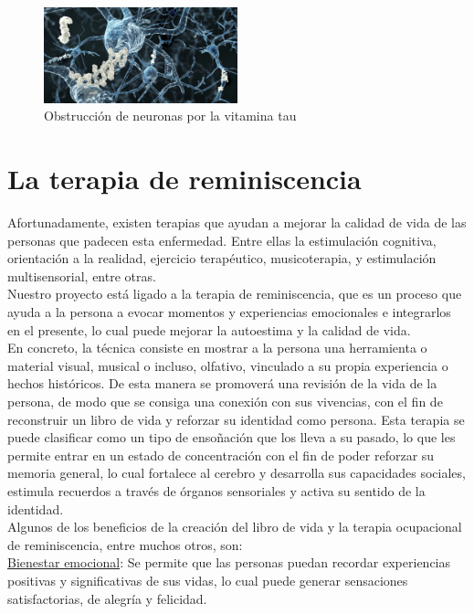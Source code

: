 \begin{figure}[h]
	\centering
	\includegraphics[width = 0.5\textwidth]{Imagenes/Vectorial/proteina-tau.jpg}
	\caption{Obstrucción de neuronas por la vitamina tau}
	\label{fig:tau}
\end{figure}

\section{La terapia de reminiscencia}

Afortunadamente, existen terapias que ayudan a mejorar la calidad de vida de las personas que padecen esta enfermedad. Entre ellas la estimulación cognitiva, orientación a la realidad, ejercicio terapéutico, musicoterapia, y estimulación multisensorial, entre otras.\\
Nuestro proyecto está ligado a la terapia de reminiscencia, que es un proceso que ayuda a la persona a evocar momentos y experiencias emocionales e integrarlos en el presente, lo cual puede mejorar la autoestima y la calidad de vida.\\

En concreto, la técnica consiste en mostrar a la persona una herramienta o material visual, musical o incluso, olfativo, vinculado a su propia experiencia o hechos históricos. De esta manera se promoverá una revisión de la vida de la persona, de modo que se consiga una conexión con sus vivencias, con el fin de reconstruir un libro de vida y reforzar su identidad como persona.  Esta terapia se puede clasificar como un tipo de ensoñación que los lleva a su pasado, lo que les permite entrar en un estado de concentración con el fin de poder reforzar su memoria general, lo cual fortalece al cerebro y desarrolla sus capacidades sociales, estimula recuerdos a través de órganos sensoriales y activa su sentido de la identidad.\\

Algunos de los beneficios de la creación del libro de vida y la terapia ocupacional de reminiscencia, entre muchos otros, son:\\

\underline{Bienestar emocional}: Se permite que las personas puedan recordar experiencias positivas y significativas de sus vidas, lo cual puede generar sensaciones satisfactorias, de alegría y felicidad.\\

